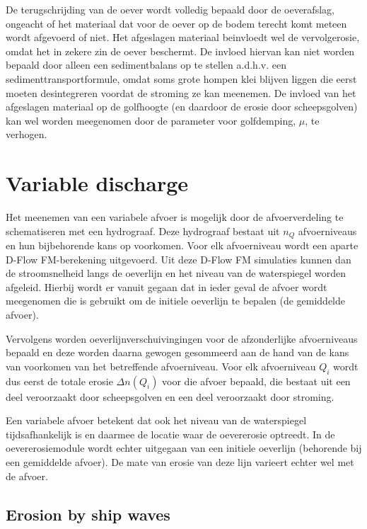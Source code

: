 De terugschrijding van de oever wordt volledig bepaald door de oeverafslag, ongeacht of het materiaal dat voor de oever op de bodem terecht komt meteen wordt afgevoerd of niet.
Het afgeslagen materiaal beinvloedt wel de vervolgerosie, omdat het in zekere zin de oever beschermt.
De invloed hiervan kan niet worden bepaald door alleen een sedimentbalans op te stellen a.d.h.v.
een sedimenttransportformule, omdat soms grote hompen klei blijven liggen die eerst moeten desintegreren voordat de stroming ze kan meenemen.
De invloed van het afgeslagen materiaal op de golfhoogte (en daardoor de erosie door scheepsgolven) kan wel worden meegenomen door de parameter voor golfdemping, $\mu$, te verhogen.

\section{Variable discharge}

Het meenemen van een variabele afvoer is mogelijk door de afvoerverdeling te schematiseren met een hydrograaf.
Deze hydrograaf bestaat uit $n_Q$ afvoerniveaus en hun bijbehorende kans op voorkomen.
Voor elk afvoerniveau wordt een aparte D-Flow FM-berekening uitgevoerd.
Uit deze D-Flow FM simulaties kunnen dan de stroomsnelheid langs de oeverlijn en het niveau van de waterspiegel worden afgeleid.
Hierbij wordt er vanuit gegaan dat in ieder geval de afvoer wordt meegenomen die is gebruikt om de initiele oeverlijn te bepalen (de gemiddelde afvoer).

Vervolgens worden oeverlijnverschuivingingen voor de afzonderlijke afvoerniveaus bepaald en deze worden daarna gewogen gesommeerd aan de hand van de kans van voorkomen van het betreffende afvoerniveau.
Voor elk afvoerniveau $Q_i$ wordt dus eerst de totale erosie $\Delta n ( Q_i )$ voor die afvoer bepaald, die bestaat uit een deel veroorzaakt door scheepsgolven en een deel veroorzaakt door stroming.

Een variabele afvoer betekent dat ook het niveau van de waterspiegel tijdsafhankelijk is en daarmee de locatie waar de oevererosie optreedt.
In de oevererosiemodule wordt echter uitgegaan van een initiele oeverlijn (behorende bij een gemiddelde afvoer).
De mate van erosie van deze lijn varieert echter wel met de afvoer.


\subsection{Erosion by ship waves}

